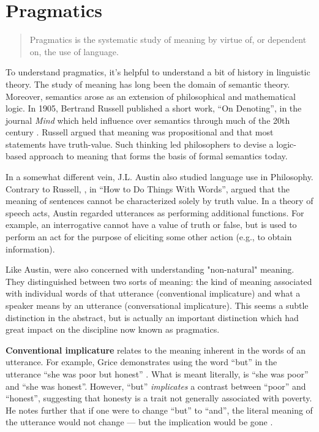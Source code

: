 \section{Pragmatics}
\label{pragmatics}


\begin{quote}
Pragmatics is the systematic study of meaning by virtue of, or dependent on, the use of language. \cite[p. 2]{Huang:2007ww}
\end{quote} 


To understand pragmatics, it's helpful to understand a bit of history in linguistic theory. The study of meaning has long been the domain of semantic theory. Moreover, semantics arose as an extension of philosophical and mathematical logic. In 1905, Bertrand Russell published a short work, ``On Denoting'', in the journal \emph{Mind} which held influence over semantics through much of the 20th century  \citep{Russell:1905tj}.  Russell argued that meaning was propositional and that most statements have truth-value. Such thinking led philosophers to devise a logic-based approach to meaning that forms the basis of formal semantics today.

In a somewhat different vein, J.L. Austin also studied language use in Philosophy. Contrary to Russell,  \cite{Austin:1975vd},  in ``How to Do Things With Words'', argued that the meaning of sentences cannot be characterized solely by truth value. In a theory of speech acts, Austin regarded utterances as performing additional functions. For example, an interrogative cannot have a value of truth or false, but is used to perform an act for the purpose of eliciting some other action (e.g., to obtain information).

\begin{sloppier}
Like Austin, \cite{Grice:1961ud} were also concerned with understanding "non-natural" meaning. They distinguished between two sorts of meaning: the kind of meaning associated with individual words of that utterance (conventional implicature) and what a speaker means by an utterance (conversational implicature). This seems a subtle distinction in the abstract, but is actually an important distinction which had great impact on the discipline now known as pragmatics.
\end{sloppier} 

\textbf{Conventional implicature} relates to the meaning inherent in the words of an utterance. For example, Grice demonstrates using the word ``but'' in the utterance ``she was poor but honest''  \cite[p. 127]{Grice:1961ud}.  What is meant literally, is ``she was poor'' and ``she was honest''. However, ``but'' \emph{implicates} a contrast between ``poor'' and ``honest'', suggesting that honesty is a trait not generally associated with poverty. He notes further that if one were to change ``but'' to ``and'', the literal meaning of the utterance would not change --- but the implication would be gone  \cite[p. 129]{Grice:1961ud}.  

